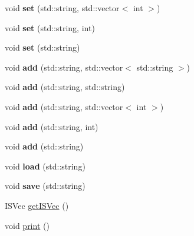 \begin{DoxyCompactItemize}
\item 
\hypertarget{classConfiguration_a13f3eb76e102c2439e3911c7cfd1f24b}{
void {\bfseries set} (std::string, std::vector$<$ int $>$)}
\label{classConfiguration_a13f3eb76e102c2439e3911c7cfd1f24b}

\item 
\hypertarget{classConfiguration_a70d52099b4506f321fc5053545dcc5f4}{
void {\bfseries set} (std::string, int)}
\label{classConfiguration_a70d52099b4506f321fc5053545dcc5f4}

\item 
\hypertarget{classConfiguration_a0635aaef8a817e248f82b21b80216de7}{
void {\bfseries set} (std::string)}
\label{classConfiguration_a0635aaef8a817e248f82b21b80216de7}

\item 
\hypertarget{classConfiguration_ad4a4801855f580bc333dae7e0325bc86}{
void {\bfseries add} (std::string, std::vector$<$ std::string $>$)}
\label{classConfiguration_ad4a4801855f580bc333dae7e0325bc86}

\item 
\hypertarget{classConfiguration_af036372880e69bce1378d83659310831}{
void {\bfseries add} (std::string, std::string)}
\label{classConfiguration_af036372880e69bce1378d83659310831}

\item 
\hypertarget{classConfiguration_a5c393d09dae3c34659a2b2b5e24af03d}{
void {\bfseries add} (std::string, std::vector$<$ int $>$)}
\label{classConfiguration_a5c393d09dae3c34659a2b2b5e24af03d}

\item 
\hypertarget{classConfiguration_adbf2c5bd6692d680acef00c8f9e0246f}{
void {\bfseries add} (std::string, int)}
\label{classConfiguration_adbf2c5bd6692d680acef00c8f9e0246f}

\item 
\hypertarget{classConfiguration_aa51e2cf9c1dffb8621601148ead7e37f}{
void {\bfseries add} (std::string)}
\label{classConfiguration_aa51e2cf9c1dffb8621601148ead7e37f}

\item 
\hypertarget{classConfiguration_a3f91c1a4839f2c450fb2c179a52d21d0}{
void {\bfseries load} (std::string)}
\label{classConfiguration_a3f91c1a4839f2c450fb2c179a52d21d0}

\item 
\hypertarget{classConfiguration_a2c50e5b6864d2b17f2af686e0696a561}{
void {\bfseries save} (std::string)}
\label{classConfiguration_a2c50e5b6864d2b17f2af686e0696a561}

\item 
ISVec \hyperlink{classConfiguration_a2b9f9b1b127b8e3229c5cccab952d3b7}{getISVec} ()
\item 
void \hyperlink{classConfiguration_a5c96c0cb75e5b619068b0045605844a5}{print} ()
\end{DoxyCompactItemize}
